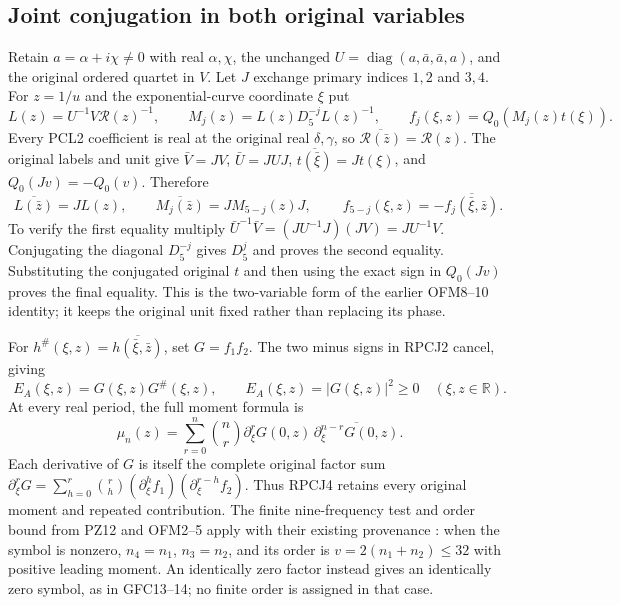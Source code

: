 \documentclass[11pt]{article}
\begin{document}
\subsection{Joint conjugation in both original variables}
Retain $a=\alpha+i\chi\ne0$ with real $\alpha,\chi$, the unchanged
$U=\operatorname{diag}(a,\bar a,\bar a,a)$, and the original
ordered quartet in $V$. Let $J$ exchange primary indices $1,2$ and
$3,4$. For $z=1/u$ and the exponential-curve coordinate $\xi$ put
\[
 L(z)=U^{-1}V\mathcal R(z)^{-1},\qquad
 M_j(z)=L(z)D_5^{-j}L(z)^{-1},\qquad
 f_j(\xi,z)=Q_0(M_j(z)t(\xi)).
 \tag{RPCJ1}
\]
Every PCL2 coefficient is real at the original real $\delta,\gamma$,
so $\overline{\mathcal R(\bar z)}=\mathcal R(z)$.
The original labels and unit give
$\bar V=JV$, $\bar U=JUJ$, $\overline{t(\bar\xi)}=Jt(\xi)$,
and $Q_0(Jv)=-Q_0(v)$. Therefore
\[
 \overline{L(\bar z)}=JL(z),\qquad
 \overline{M_j(\bar z)}=JM_{5-j}(z)J,
 \qquad
 \boxed{\ f_{5-j}(\xi,z)=-\overline{f_j(\bar\xi,\bar z)}.\ }
 \tag{RPCJ2}
\]
To verify the first equality multiply
$\bar U^{-1}\bar V=(JU^{-1}J)(JV)=JU^{-1}V$.
Conjugating the diagonal $D_5^{-j}$ gives $D_5^j$ and proves the
second equality. Substituting the conjugated original $t$ and then
using the exact sign in $Q_0(Jv)$ proves the final equality.
This is the two-variable form of the earlier OFM8--10 identity;
it keeps the original unit fixed rather than replacing its phase.

For $h^\#(\xi,z)=\overline{h(\bar\xi,\bar z)}$, set
$G=f_1f_2$. The two minus signs in RPCJ2 cancel, giving
\[
 E_A(\xi,z)=G(\xi,z)G^\#(\xi,z),\qquad
 E_A(\xi,z)=|G(\xi,z)|^2\ge0
                 \quad(\xi,z\in\mathbb R).
 \tag{RPCJ3}
\]
At every real period, the full moment formula is
\[
 \mu_n(z)=\sum_{r=0}^n\binom nr
        \partial_\xi^rG(0,z)\,
                  \overline{\partial_\xi^{n-r}G(0,z)}.
 \tag{RPCJ4}
\]
Each derivative of $G$ is itself the complete original factor sum
$\partial_\xi^rG=\sum_{h=0}^r\binom rh
(\partial_\xi^hf_1)(\partial_\xi^{r-h}f_2)$.
Thus RPCJ4 retains every original moment and repeated contribution.
The finite nine-frequency test and order bound from PZ12 and OFM2--5
apply with their existing provenance
\cite{PeriodZeroOriginal,Cumulative}: when the symbol is nonzero,
$n_4=n_1$, $n_3=n_2$, and its order is
$v=2(n_1+n_2)\le32$ with positive leading moment.
An identically zero factor instead gives an identically zero symbol,
as in GFC13--14; no finite order is assigned in that case.
\end{document}
